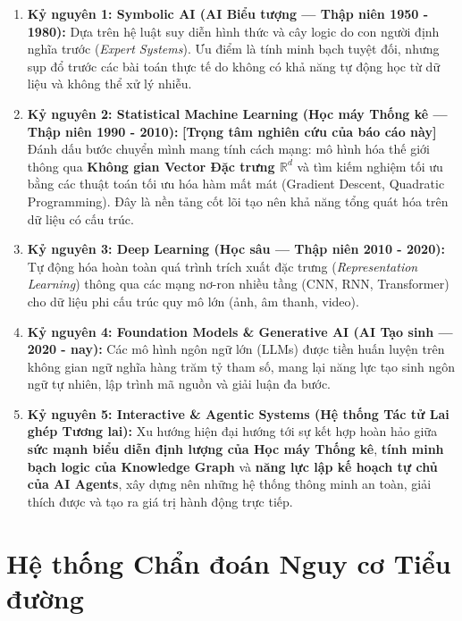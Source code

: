 \documentclass[12pt,a4paper]{report}
\begin{document}
\begin{enumerate}[leftmargin=1.5em]
    \item \textbf{Kỷ nguyên 1: Symbolic AI (AI Biểu tượng — Thập niên 1950 - 1980):} Dựa trên hệ luật suy diễn hình thức và cây logic do con người định nghĩa trước (\textit{Expert Systems}). Ưu điểm là tính minh bạch tuyệt đối, nhưng sụp đổ trước các bài toán thực tế do không có khả năng tự động học từ dữ liệu và không thể xử lý nhiễu.
    
    \item \textbf{Kỷ nguyên 2: Statistical Machine Learning (Học máy Thống kê — Thập niên 1990 - 2010):} \textbf{[Trọng tâm nghiên cứu của báo cáo này]} Đánh dấu bước chuyển mình mang tính cách mạng: mô hình hóa thế giới thông qua \textbf{Không gian Vector Đặc trưng $\mathbb{R}^d$} và tìm kiếm nghiệm tối ưu bằng các thuật toán tối ưu hóa hàm mất mát (Gradient Descent, Quadratic Programming). Đây là nền tảng cốt lõi tạo nên khả năng tổng quát hóa trên dữ liệu có cấu trúc.
    
    \item \textbf{Kỷ nguyên 3: Deep Learning (Học sâu — Thập niên 2010 - 2020):} Tự động hóa hoàn toàn quá trình trích xuất đặc trưng (\textit{Representation Learning}) thông qua các mạng nơ-ron nhiều tầng (CNN, RNN, Transformer) cho dữ liệu phi cấu trúc quy mô lớn (ảnh, âm thanh, video).
    
    \item \textbf{Kỷ nguyên 4: Foundation Models \& Generative AI (AI Tạo sinh — 2020 - nay):} Các mô hình ngôn ngữ lớn (LLMs) được tiền huấn luyện trên không gian ngữ nghĩa hàng trăm tỷ tham số, mang lại năng lực tạo sinh ngôn ngữ tự nhiên, lập trình mã nguồn và giải luận đa bước.
    
    \item \textbf{Kỷ nguyên 5: Interactive \& Agentic Systems (Hệ thống Tác tử Lai ghép Tương lai):} Xu hướng hiện đại hướng tới sự kết hợp hoàn hảo giữa \textbf{sức mạnh biểu diễn định lượng của Học máy Thống kê}, \textbf{tính minh bạch logic của Knowledge Graph} và \textbf{năng lực lập kế hoạch tự chủ của AI Agents}, xây dựng nên những hệ thống thông minh an toàn, giải thích được và tạo ra giá trị hành động trực tiếp.
\end{enumerate}

\chapter{Hệ thống Chẩn đoán Nguy cơ Tiểu đường}
\end{document}
